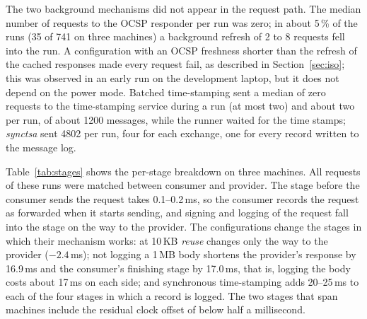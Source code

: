 \documentclass[conference,a4paper]{IEEEtran}
\begin{document}
The two background mechanisms did not appear in the request path. The median number of requests to
the OCSP responder per run was zero; in about 5\,\% of the runs (35 of 741 on three machines) a
background refresh of 2 to 8 requests fell into the run. A configuration with an OCSP freshness
shorter than the refresh of the cached responses made every request fail, as described in
Section~\ref{sec:iso}; this was observed in an early run on the development laptop, but it does not depend on
the power mode. Batched time-stamping sent a median of zero requests to the time-stamping service
during a run (at most two) and about two per run, of about 1200 messages, while the runner waited for
the time stamps; \emph{synctsa} sent 4802 per run, four for each exchange, one for
every record written to the message log.

Table~\ref{tab:stages} shows the per-stage breakdown on three machines. All requests of these runs
were matched between consumer and provider. The stage before the consumer sends the request takes
0.1--0.2\,ms, so the consumer records the request as forwarded when it starts sending, and signing and
logging of the request fall into the stage on the way to the provider. The configurations change the
stages in which their mechanism works: at 10\,KB \emph{reuse} changes only the way to the provider ($-2.4$\,ms);
not logging a 1\,MB body shortens the provider's response by 16.9\,ms and the consumer's finishing
stage by 17.0\,ms, that is, logging the body costs about 17\,ms on each side; and synchronous
time-stamping adds 20--25\,ms to each of the four stages in which a record is logged. The two stages
that span machines include the residual clock offset of below half a millisecond.
\end{document}
